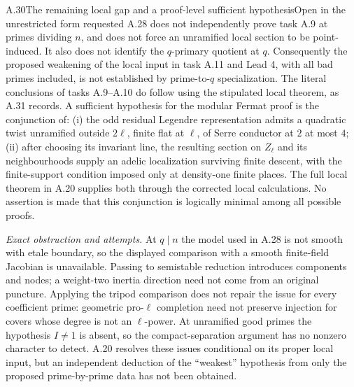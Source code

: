 \begin{statement}{A.30}{The remaining local gap and a proof-level sufficient hypothesis}{Open in the unrestricted form requested}
A.28 does not independently prove task A.9 at primes dividing $n$, and does not force an unramified local section to be point-induced. It also does not identify the $q$-primary quotient at $q$. Consequently the proposed weakening of the local input in task A.11 and Lead 4, with all bad primes included, is not established by prime-to-$q$ specialization. The literal conclusions of tasks A.9--A.10 do follow using the stipulated local theorem, as A.31 records.
A sufficient hypothesis for the modular Fermat proof is the conjunction of: (i) the odd residual Legendre representation admits a quadratic twist unramified outside $2\ell$, finite flat at $\ell$, of Serre conductor at $2$ at most $4$; (ii) after choosing its invariant line, the resulting section on $Z_\ell$ and its neighbourhoods supply an adelic localization surviving finite descent, with the finite-support condition imposed only at density-one finite places. The full local theorem in A.20 supplies both through the corrected local calculations. No assertion is made that this conjunction is logically minimal among all possible proofs.
\end{statement}
\noindent\textit{Exact obstruction and attempts.}
At $q\mid n$ the model used in A.28 is not smooth with etale boundary, so the displayed comparison with a smooth finite-field Jacobian is unavailable. Passing to semistable reduction introduces components and nodes; a weight-two inertia direction need not come from an original puncture. Applying the tripod comparison does not repair the issue for every coefficient prime: geometric pro-$\ell$ completion need not preserve injection for covers whose degree is not an $\ell$-power. At unramified good primes the hypothesis $I\ne1$ is absent, so the compact-separation argument has no nonzero character to detect. A.20 resolves these issues conditional on its proper local input, but an independent deduction of the ``weakest'' hypothesis from only the proposed prime-by-prime data has not been obtained.

